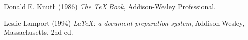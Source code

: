 \begin{thebibliography}{9}
    Donald E. Knuth (1986) \emph{The \TeX{} Book}, Addison-Wesley Professional.
    
    Leslie Lamport (1994) \emph{\LaTeX: a document preparation system}, Addison
    Wesley, Massachusetts, 2nd ed.
\end{thebibliography}